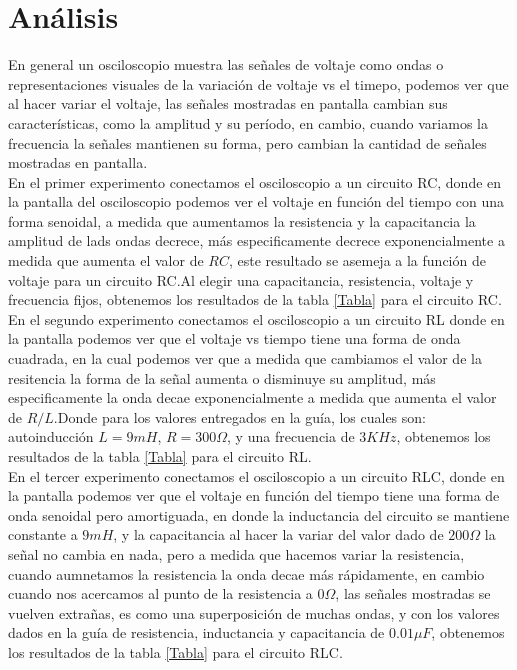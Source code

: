 \documentclass[]{article}
\begin{document}
\section{Análisis}
En general un osciloscopio muestra las señales de voltaje como ondas o representaciones visuales de la variación de voltaje vs el timepo, podemos ver que al hacer variar el voltaje, las señales mostradas en pantalla cambian sus características, como la amplitud y su período, en cambio, cuando variamos la frecuencia la señales mantienen su forma, pero cambian la cantidad de señales mostradas en pantalla.\\  
 
En el primer experimento conectamos el osciloscopio a un circuito RC, donde en la pantalla del osciloscopio podemos ver el voltaje en función del tiempo con una forma senoidal, a medida que aumentamos la resistencia y la capacitancia la amplitud de lads ondas decrece, más especificamente decrece exponencialmente a medida que aumenta el valor de $RC$, este resultado se asemeja a la función de voltaje para un circuito RC.Al elegir una capacitancia, resistencia, voltaje y frecuencia fijos, obtenemos los resultados de la tabla \ref{Tabla} para el circuito RC.\\

En el segundo experimento conectamos el osciloscopio a un circuito RL donde en la pantalla podemos ver que el voltaje vs tiempo tiene una forma de onda cuadrada, en la cual podemos ver que a medida que cambiamos el valor de la resitencia la forma de la señal aumenta o disminuye su amplitud, más especificamente la onda decae exponencialmente a medida que aumenta el valor de $R/L$.Donde para los valores entregados en la guía, los cuales son: autoinducción $L= 9mH$, $R = 300 \Omega$, y una frecuencia de $3 KHz$, obtenemos los resultados de la tabla \ref{Tabla} para el circuito RL.\\

En el tercer experimento conectamos el osciloscopio a un circuito RLC, donde en la pantalla podemos ver que  el voltaje en función del tiempo tiene una forma de onda senoidal pero amortiguada, en donde la inductancia del circuito se mantiene constante a $9mH$, y la capacitancia al hacer la variar del valor dado de $200 \Omega$ la señal no cambia en nada, pero a medida que hacemos variar la resistencia, cuando aumnetamos la resistencia la onda decae más rápidamente, en cambio cuando nos acercamos al punto de la resistencia a $0 \Omega$, las señales mostradas se vuelven extrañas, es como una superposición de muchas ondas, y con los valores dados en la guía de resistencia, inductancia y capacitancia de $0.01 \mu F$, obtenemos los resultados de la tabla \ref{Tabla} para el circuito  RLC.\\
\end{document}
